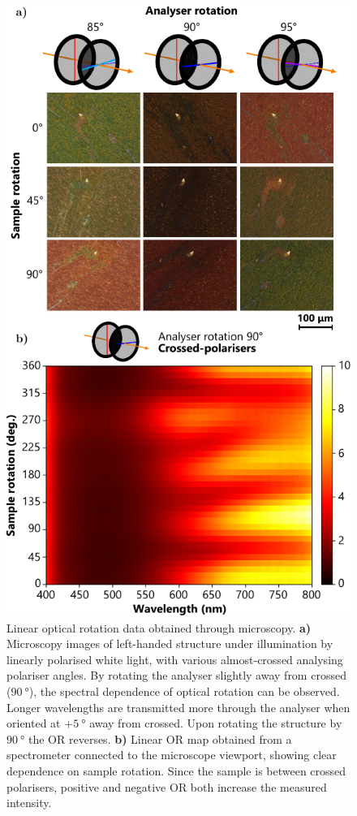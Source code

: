 \begin{figure}[htb!]	
    \centering	
    \includegraphics[scale=1]{./figures/results/OAinPlanarNanohelices/lin_data.pdf}

    \caption{\label{fig:results:OAinPlanarNanohelices:lin_data}
    Linear optical rotation data obtained through microscopy. \textbf{a)} Microscopy images of left-handed structure under illumination by linearly polarised white light, with various almost-crossed analysing polariser angles. By rotating the analyser slightly away from crossed ($\SI{90}{\degree}$), the spectral dependence of optical rotation can be observed. Longer wavelengths are transmitted more through the analyser when oriented at $+\SI{5}{\degree}$ away from crossed. Upon rotating the structure by $\SI{90}{\degree}$ the OR reverses. \textbf{b)} Linear OR map obtained from a spectrometer connected to the microscope viewport, showing clear dependence on sample rotation. Since the sample is between crossed polarisers, positive and negative OR both increase the measured intensity.}
\end{figure}

